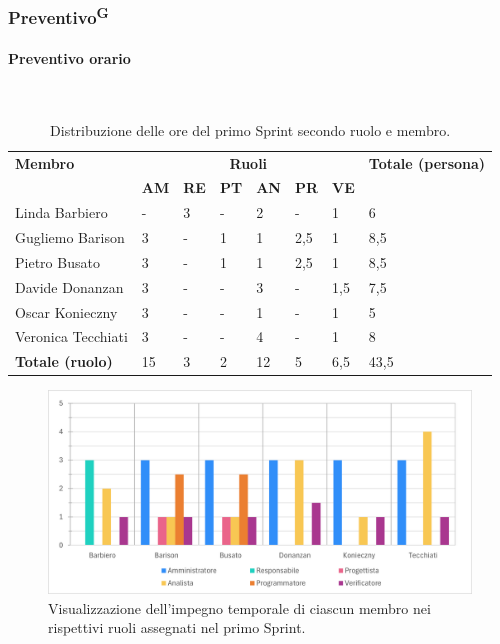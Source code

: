 \documentclass[8pt]{article}
\newcommand{\glossterm}[1]{#1\textsuperscript{G}} %
\newcommand{\subsubsubsection}[1]{\paragraph{#1}\mbox{}\\}
\begin{document}
\subsubsection{\glossterm{Preventivo}}
\subsubsubsection{Preventivo orario}
\begin{table}[ht!]
	\centering
	\begin{tabular}{p{4cm} p{1cm} p{1cm} p{1cm} p{1cm} p{1cm} p{1cm} p{3cm}}
		\toprule
        \textbf{Membro} & \multicolumn{6}{c}{\textbf{Ruoli}} & \textbf{Totale (persona)}\\
		& \textbf{AM} & \textbf{RE} & \textbf{PT} & \textbf{AN} & \textbf{PR} & \textbf{VE}\\
		\midrule
        Linda Barbiero & - & 3 & - & 2 & - & 1 & 6 \\
        Gugliemo Barison & 3 & - & 1 & 1 & 2,5 & 1 & 8,5 \\
        Pietro Busato & 3 & - & 1 & 1 & 2,5 & 1 & 8,5 \\
        Davide Donanzan & 3 & - & - & 3 & - & 1,5 & 7,5 \\
        Oscar Konieczny & 3 & - & - & 1 & - & 1 & 5 \\
        Veronica Tecchiati & 3 & - & - & 4 & - & 1 & 8 \\
        \midrule
        \textbf{Totale (ruolo)} & 15 & 3 & 2 & 12 & 5 & 6,5 & 43,5 \\
	\bottomrule
	\end{tabular}
	\caption{Distribuzione delle ore del primo Sprint secondo ruolo e membro.}
	\label{table:Distribuzione delle ore del primo Sprint secondo ruolo e membro}
\end{table}
\begin{figure}[ht!]
    \centering
    \includegraphics[width=15cm]{./images_pdp/istogramma_periodo_1.png}
    \caption{Visualizzazione dell'impegno temporale di ciascun membro nei rispettivi ruoli assegnati
    nel primo Sprint.}
    \label{figure:Visualizzazione dell'impegno temporale di ciascun membro nei rispettivi ruoli
    assegnati nel primo Sprint}
\end{figure}
\end{document}
